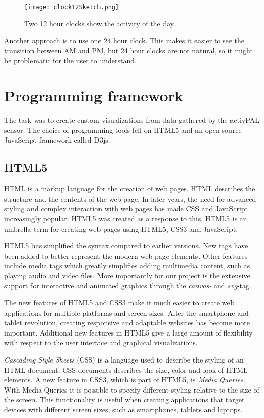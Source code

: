 \begin{figure}[h!]
	\centering
		\texttt{[image: clock12Sketch.png]}
		\caption{\footnotesize Two 12 hour clocks show the activity of the day.}
		\label{fig:clock12}
\end{figure}

Another approach is to use one 24 hour clock. This makes it easier to see the transition between AM and PM, but 24 hour clocks are not natural, so it might be problematic for the user to understand.

\section{Programming framework}
The task was to create custom visualizations from data gathered by the activPAL sensor. The choice of programming tools fell on HTML5 and an open source JavaScript framework called D3js.

\subsection{HTML5}
HTML is a markup language for the creation of web pages. HTML describes the structure and the contents of the web page. In later years, the need for advanced styling and complex interaction with web pages has made CSS and JavaScript increasingly popular. HTML5 was created as a response to this, HTML5 is an umbrella term for creating web pages using HTML5, CSS3 and JavaScript.

HTML5 has simplified the syntax compared to earlier versions. New tags have been added to better represent the modern web page elements. Other features include media tags which greatly simplifies adding multimedia content, such as playing audio and video files. More importantly for our project is the extensive support for interactive and animated graphics through the \emph{canvas-} and \emph{svg}-tag.

The new features of HTML5 and CSS3 make it much easier to create web applications for multiple platforms and screen sizes. After the smartphone and tablet revolution, creating responsive and adaptable websites has become more important. Additional new features in HTML5 give a large amount of flexibility with respect to the user interface and graphical visualizations.

\emph{Cascading Style Sheets} (CSS) is a language used to describe the styling of an HTML document. CSS documents describes the size, color and look of HTML elements. A new feature in CSS3, which is part of HTML5, is \emph{Media Queries}. With Media Queries it is possible to specify different styling relative to the size of the screen. This functionality is useful when creating applications that target devices with different screen sizes, such as smartphones, tablets and laptops. 

